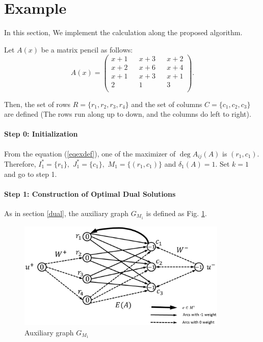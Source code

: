 \section{Example}

In this section, We implement the calculation along the proposed algorithm.

\begin{example}
Let $A(x) $ be a matrix pencil as follows:
\begin{equation}
A(x) = \left( \begin{array}{ccccc}
x+1 & & x+3 & & x+2 \\ x+2 & & x+6 & & x+4 \\ x+1 & & x+3 & & x+1 \\ 2 & & 1 & & 3 \\
\end{array} \right). \label{eqexdef}
\end{equation}

Then, the set of rows $ R = \{ r_1 , r_2 , r_3 , r_4 \} $ and the set of columns $ C = \{ c_1 ,c_2 ,c_3 \} $ are defined (The rows run along up to down, and the columns do left to right).

\paragraph{Step 0: Initialization\\}
From the equation (\ref{eqexdef}), one of the maximizer of $ \deg A_{ij} (A) $ is $ ( r_1 ,c_1 ) $. 
Therefore, $ I^{\ast}_1 = \{ r_1 \}, $ $J^{\ast}_1 = \{ c_1 \}, $ $ M_1 = \{ (r_1, c_1)\} $ and $ \delta_1 (A) = 1 $.
Set $ k = 1 $ and go to step 1.

\paragraph{Step 1: Construction of Optimal Dual Solutions\\}
As in section \ref{dual}, the auxiliary graph $ G_{M_1} $ is defined as Fig. \ref{figaux1}.

\begin{figure}
\centering
\includegraphics[width=10cm]{figauxgraph1.eps}
\caption{Auxiliary graph $ G_{M_1}$}
\label{figaux1}
\end{figure}


\end{example}
